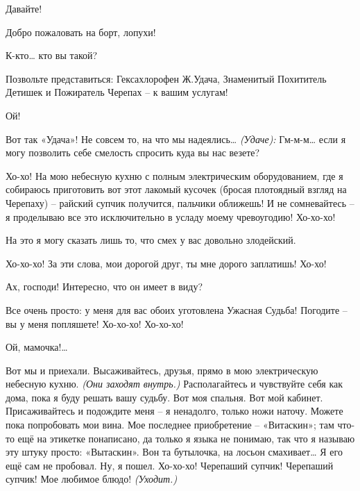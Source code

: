 \documentclass[../main.tex]{subfiles}
\begin{document}
\begin{Dialogue}
 Давайте!


 Добро пожаловать на борт, лопухи!

 К-кто\ldots{} кто вы такой?

 Позвольте представиться: Гексахлорофен Ж.\@ Удача, Знаменитый Похититель Детишек и Пожиратель Черепах \--- к вашим услугам!

 Ой!

 Вот так «Удача»! Не совсем то, на что мы надеялись\ldots{} \emph{(Удаче):} Гм-м-м\ldots{} если я могу позволить себе смелость спросить куда вы нас везете?

 Хо-хо! На мою небесную кухню с полным электрическим оборудованием, где я собираюсь приготовить вот этот лакомый кусочек (бросая плотоядный взгляд на Черепаху) \--- райский супчик получится, пальчики оближешь! И не сомневайтесь \--- я проделываю все это исключительно в усладу моему чревоугодию! Хо-хо-хо!

 На это я могу сказать лишь то, что смех у вас довольно злодейский.

 Хо-хо-хо! За эти слова, мои дорогой друг, ты мне дорого заплатишь! Хо-хо!

 Ах, господи! Интересно, что он имеет в виду?

 Все очень просто: у меня для вас обоих уготовлена Ужасная Судьба! Погодите \--- вы у меня попляшете! Хо-хо-хо! Хо-хо-хо!

 Ой, мамочка!\ldots{}

 Вот мы и приехали. Высаживайтесь, друзья, прямо в мою электрическую небесную кухню. \emph{(Они заходят внутрь.)} Располагайтесь и чувствуйте себя как дома, пока я буду решать вашу судьбу. Вот моя спальня. Вот мой кабинет. Присаживайтесь и подождите меня \--- я ненадолго, только ножи наточу. Можете пока попробовать мои вина. Мое последнее приобретение \--- «Витаскин»; там что-то ещё на этикетке понаписано, да только я языка не понимаю, так что я называю эту штуку просто: «Вытаскин». Вон та бутылочка, на лосьон смахивает\ldots{} Я его ещё сам не пробовал. Ну, я пошел. Хо-хо-хо! Черепаший супчик! Черепаший супчик! Мое любимое блюдо! \emph{(Уходит.)}


\end{Dialogue}
\end{document}
